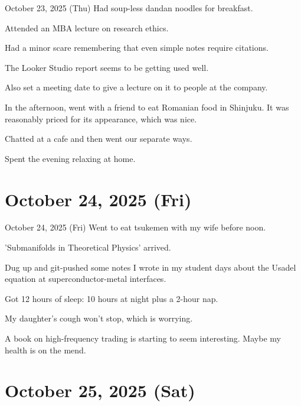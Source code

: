 \documentclass[dvipdfmx, autodetect-engine, aspectratio=169, 10.5pt]{beamer}
\begin{document}
\begin{frame}{October 23, 2025 (Thu)}
Had soup-less dandan noodles for breakfast.

Attended an MBA lecture on research ethics.

Had a minor scare remembering that even simple notes require citations.

The Looker Studio report seems to be getting used well.

Also set a meeting date to give a lecture on it to people at the company.

In the afternoon, went with a friend to eat Romanian food in Shinjuku.
It was reasonably priced for its appearance, which was nice.

Chatted at a cafe and then went our separate ways.

Spent the evening relaxing at home.
\end{frame}

\section{October 24, 2025 (Fri)}

\begin{frame}{October 24, 2025 (Fri)}
Went to eat tsukemen with my wife before noon.

'Submanifolds in Theoretical Physics' arrived.

Dug up and git-pushed some notes I wrote in my student days about the Usadel equation at superconductor-metal interfaces.

Got 12 hours of sleep: 10 hours at night plus a 2-hour nap.

My daughter's cough won't stop, which is worrying.

A book on high-frequency trading is starting to seem interesting.
Maybe my health is on the mend.
\end{frame}

\section{October 25, 2025 (Sat)}
\end{document}
